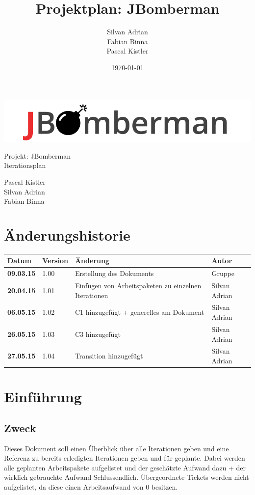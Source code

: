 \documentclass[11pt]{scrartcl}
\title{Projektplan: JBomberman}
\author{Silvan Adrian \\ Fabian Binna \\ Pascal Kistler}
\date{\today{}}
\begin{document}
\def\arraystretch{1.5}
\begin{titlepage}
\begin{center}
\vspace{10em}
\includegraphics[scale=2]{jbomberman}
\vspace{10em}
\end{center}
\begin{center}
\huge {Projekt: JBomberman} \\
\huge {Iterationsplan}
\end{center}
\begin{center}
\vspace{10em}
\LARGE {Pascal Kistler} \\
\LARGE {Silvan Adrian} \\
\LARGE {Fabian Binna}
\end{center}

\end{titlepage}

\newpage
\section{Änderungshistorie}
\label{sec:Änderungen}

\begin{tabularx}{\linewidth}{l l X l}
\textbf{Datum} & \textbf{Version} & \textbf{Änderung}  & \textbf{Autor} \\
\hline
\textbf{09.03.15} & 1.00 & Erstellung des Dokuments & Gruppe \\
\bf{20.04.15} & 1.01 & Einfügen von Arbeitspaketen zu einzelnen Iterationen & 
Silvan Adrian\\
\bf{06.05.15} & 1.02 & C1 hinzugefügt + generelles am Dokument & Silvan Adrian\\
\bf{26.05.15} & 1.03 & C3 hinzugefügt & Silvan Adrian\\
\bf{27.05.15} & 1.04 & Transition hinzugefügt & Silvan Adrian\\
\end{tabularx}

\newpage
\tableofcontents
\newpage
\section{Einführung}
\subsection{Zweck}
Dieses Dokument soll einen Überblick über alle Iterationen geben und eine 
Referenz zu bereits erledigten Iterationen geben und für geplante.
Dabei werden alle geplanten Arbeitspakete aufgelistet und der geschätzte Aufwand 
dazu + der wirklich gebrauchte Aufwand Schlussendlich.
Übergeordnete Tickets werden nicht aufgelistet, da diese einen Arbeitsaufwand 
von 0 besitzen.
\end{document}
